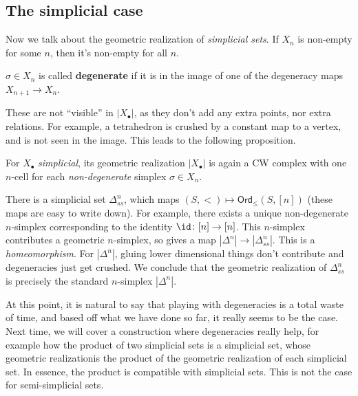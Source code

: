 \subsection{The simplicial case}
Now we talk about the geometric realization of \emph{simplicial sets}. If $X_n $ is non-empty for some $n$, then it's non-empty for all $n$. 
\begin{definition}[]
    $\sigma\in X_n $ is called \textbf{degenerate} if it is in the image of one of the degeneracy maps $X_{n+1}\to X_n $.
\end{definition}
These are not ``visible'' in $|X_{\bullet}|$, as they don't add any extra points, nor extra relations. For example, a tetrahedron is crushed by a constant map to a vertex, and is not seen in the image. This leads to the following proposition.
\begin{prop}
    For $X_{\bullet}$ \emph{simplicial}, its geometric realization $|X_{\bullet}|$ is again a CW complex with one $n$-cell for each \emph{non-degenerate} simplex $\sigma \in X_n $.
\end{prop}
\begin{example}
    There is a simplicial set $\Delta ^n _{ss}$, which maps $(S,<) \mapsto \mathsf{Ord} _{\leq}(S,[n])$ (these maps are easy to write down). For example, there exists a unique non-degenerate $n$-simplex corresponding to the identity $\id \colon [n] \to [n]$. This $n$-simplex contributes a geometric $n$-simplex, so gives a map $|\Delta ^n | \to |\Delta ^n _{ss}|$. This is a \emph{homeomorphism}. For $|\Delta ^n |$, gluing lower dimensional things don't contribute and degeneracies just get crushed. We conclude that the geometric realization of $\Delta ^n _{ss}$ is precisely the standard $n$-simplex $|\Delta ^n |$.
\end{example}
At this point, it is natural to say that playing with degeneracies is a total waste of time, and based off what we have done so far, it really seems to be the case. Next time, we will cover a construction where degeneracies really help, for example how the product of two simplicial sets is a simplicial set, whose geometric realizationis the product of the geometric realization of each simplicial set. In essence, the product is compatible with simplicial sets. This is not the case for semi-simplicial sets.
